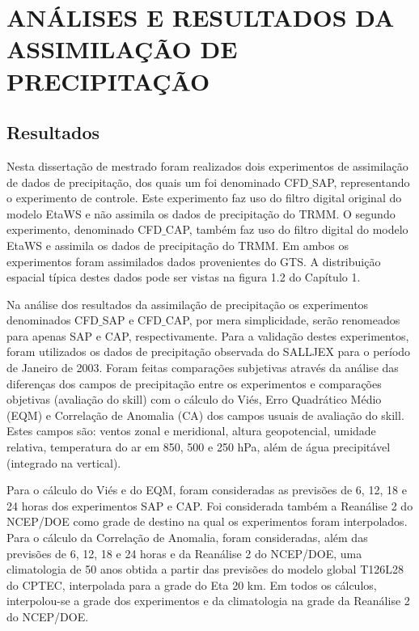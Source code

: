 \hypertarget{estilo:capitulo}{}
\chapter{ANÁLISES E RESULTADOS DA ASSIMILAÇÃO DE PRECIPITAÇÃO}

\section{Resultados}
\label{ss:resultados}

Nesta dissertação de mestrado foram realizados dois experimentos de assimilação de dados de precipitação, dos quais um foi denominado CFD$\_$SAP, representando o experimento de controle. Este experimento faz uso do filtro digital original do modelo EtaWS e não assimila os dados de precipitação do TRMM. O segundo experimento, denominado CFD$\_$CAP, também faz uso do filtro digital do modelo EtaWS e assimila os dados de precipitação do TRMM. Em ambos os experimentos foram assimilados dados provenientes do GTS. A distribuição espacial típica destes dados pode ser vistas na figura 1.2 do Capítulo 1.

Na análise dos resultados da assimilação de precipitação os experimentos denominados CFD$\_$SAP e CFD$\_$CAP, por mera simplicidade, serão renomeados para apenas SAP e CAP, respectivamente. Para a validação destes experimentos, foram utilizados os dados de precipitação observada do SALLJEX para o período de Janeiro de 2003. Foram feitas comparações subjetivas através da análise das diferenças dos campos de precipitação entre os experimentos e comparações objetivas (avaliação do skill) com o cálculo do Viés, Erro Quadrático Médio (EQM) e Correlação de Anomalia (CA) dos campos usuais de avaliação do skill. Estes campos são: ventos zonal e meridional, altura geopotencial, umidade relativa, temperatura do ar em 850, 500 e 250 hPa, além de água precipitável (integrado na vertical).

Para o cálculo do Viés e do EQM, foram consideradas as previsões de 6, 12, 18 e 24 horas dos experimentos SAP e CAP. Foi considerada também a Reanálise 2 do NCEP/DOE como grade de destino na qual os experimentos foram interpolados. Para o cálculo da Correlação de Anomalia, foram consideradas, além das previsões de 6, 12, 18 e 24 horas e da Reanálise 2 do NCEP/DOE, uma climatologia de 50 anos obtida a partir das previsões do modelo global T126L28 do CPTEC, interpolada para a grade do Eta 20 km. 
Em todos os cálculos, interpolou-se a grade dos experimentos e da climatologia na grade da Reanálise 2 do NCEP/DOE.


